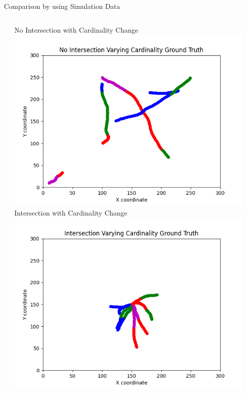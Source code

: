 \documentclass[12pt]{beamer}
\begin{document}
\begin{frame}{Comparison by using Simulation Data}
\begin{columns}[t]
\begin{column}{0.333\linewidth}
  \end{column}
  \begin{column}{0.333\linewidth}
      \centering
      \scriptsize No Intersection with Cardinality Change\\
      \includegraphics[width=\linewidth,height=0.32\textheight,keepaspectratio]{ground_truth/No Intersection Varying Cardinality_track.png}
      \scriptsize Intersection with Cardinality Change\\
      \includegraphics[width=\linewidth,height=0.32\textheight,keepaspectratio]{ground_truth/Intersection Varying Cardinality_track.png}
  \end{column}
  \begin{column}{0.333\linewidth}

\end{column}
\end{columns}
\end{frame}
\end{document}
